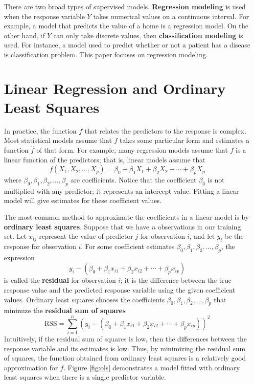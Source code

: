 \documentclass{article}
\begin{document}
There are two broad types of supervised models. \textbf{Regression modeling} is used when the response variable $Y$ takes numerical values on a continuous interval. For example, a model that predicts the value of a home is a regression model. On the other hand, if $Y$ can only take discrete values, then \textbf{classification modeling} is used. For instance, a model used to predict whether or not a patient has a disease is classification problem. This paper focuses on regression modeling.

\section{Linear Regression and Ordinary Least Squares}

In practice, the function $f$ that relates the predictors to the response is complex. Most statistical models assume that $f$ takes some particular form and estimates a function $\hat{f}$ of that form. For example, many regression models assume that $f$ is a linear function of the predictors; that is, linear models assume that
\begin{equation}\label{eqn:linear-model}
	f(X_1, X_2, \dotsc, X_p) = \beta_0 + \beta_1 X_1 + \beta_2 X_2 + \cdots + \beta_p X_p
\end{equation}
where $\beta_0, \beta_1, \beta_2, \dotsc, \beta_p$ are coefficients. Notice that the coefficient $\beta_0$ is not multiplied with any predictor; it represents an intercept value. Fitting a linear model will give estimates for these coefficient values.

The most common method to approximate the coefficients in a linear model is by \textbf{ordinary least squares}. Suppose that we have $n$ observations in our training set. Let $x_{ij}$ represent the value of predictor $j$ for observation $i$, and let $y_i$ be the response for observation $i$. For some coefficient estimates $\beta_0, \beta_1, \beta_2, \dotsc, \beta_p$, the expression
\begin{equation}
	y_i - (\beta_0 + \beta_1 x_{i1} + \beta_2 x_{i2} + \cdots + \beta_p x_{ip})
\end{equation}
is called the \textbf{residual} for observation $i$; it is the difference between the true response value and the predicted response variable using the given coefficient values. Ordinary least squares chooses the coefficients $\beta_0, \beta_1, \beta_2, \dotsc, \beta_p$ that minimize the \textbf{residual sum of squares}
\begin{equation}\label{eqn:RSS}
	\text{RSS} = \sum\limits_{i = 1}^n (y_i - (\beta_0 + \beta_1 x_{i1} + \beta_2 x_{i2} + \cdots + \beta_p x_{ip}))^2
\end{equation}
Intuitively, if the residual sum of squares is low, then the differences between the response variable and its estimates is low. Thus, by minimizing the residual sum of squares, the function obtained from ordinary least squares is a relatively good approximation for $f$. Figure \ref{fig:ols} demonstrates a model fitted with ordinary least squares when there is a single predictor variable.
\end{document}
